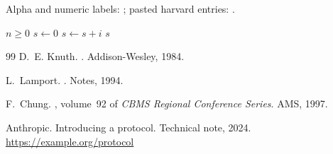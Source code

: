 \documentclass[a4paper]{article}%
\begin{document}

Alpha and numeric labels: \cite{chu1997,web2024}; pasted harvard entries:
\cite{armagan2013,bai2020}.
\begin{algorithmic}%
\REQUIRE $n \ge 0$
\STATE $s \leftarrow 0$
 \STATE $s \leftarrow s + i$ \ENDFOR
\RETURN $s$
\end{algorithmic}
\begin{thebibliography}{99}
\providecommand{\noopsort}[1]{}
 D.~E. Knuth.
.
\newblock Addison-Wesley, 1984.

 L.~Lamport.
.
 Notes, 1994.

 F.~Chung.
, volume~92 of {\em CBMS Regional
  Conference Series}.
\newblock AMS, 1997.

 Anthropic. Introducing a protocol. Technical note, 2024.
\url{https://example.org/protocol}

\end{thebibliography}
\end{document}
